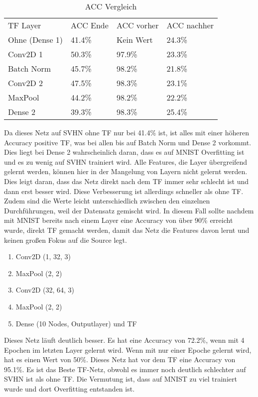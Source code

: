    \begin{table}[h!]
        \begin{center}
            \caption{ACC Vergleich}
            \label{tab1:Table}
            \begin{tabular}{l|l|l|l}
                TF Layer & ACC Ende & ACC vorher & ACC nachher \\
                Ohne (Dense 1) & 41.4\% & Kein Wert & 24.3\% \\
                Conv2D 1 & 50.3\% & 97.9\% & 23.3\% \\
                Batch Norm & 45.7\% & 98.2\% & 21.8\% \\
                Conv2D 2 & 47.5\% & 98.3\% & 23.1\% \\
                MaxPool & 44.2\% & 98.2\% & 22.2\% \\
                Dense 2 & 39.3\% & 98.3\% & 25.4\% \\
            \end{tabular}
        \end{center}
    \end{table}
    Da dieses Netz auf SVHN ohne TF nur bei 41.4\% ist, ist alles mit einer höheren Accuracy 
    positive TF, was bei allen bis auf Batch Norm und Dense 2 vorkommt. Dies liegt bei Dense 2 
    wahrscheinlich daran, dass es auf MNIST Overfitting ist und es zu wenig auf SVHN trainiert wird. 
    Alle Features, die Layer übergreifend gelernt werden, können hier in der Mangelung von Layern 
    nicht gelernt werden. Dies leigt daran, dass das Netz direkt nach dem TF immer sehr schlecht ist 
    und dann erst besser wird. Diese Verbesserung ist allerdings schneller als ohne TF. Zudem 
    sind die Werte leicht unterschiedlich zwischen den einzelnen Durchführungen, weil der 
    Datensatz gemischt wird. 
    In diesem Fall sollte nachdem mit MNIST bereits nach einem Layer eine Accuracy von über 90\% 
    erreicht wurde, direkt TF gemacht werden, damit das Netz die Features davon lernt und keinen 
    großen Fokus auf die Source legt. 


    \begin{enumerate}
        \item Conv2D (1, 32, 3)
        \item MaxPool (2, 2)
        \item Conv2D (32, 64, 3)
        \item MaxPool (2, 2)
        \item Dense (10 Nodes, Outputlayer) und TF
    \end{enumerate}
    Dieses Netz läuft deutlich besser. Es hat eine Accuracy von 72.2\%, wenn mit 4 Epochen im 
    letzten Layer gelernt wird. Wenn mit nur einer Epoche gelernt wird, hat es einen Wert von 
    50\%. 
    Dieses Netz hat vor dem TF eine Accuracy von 95.1\%. Es ist das Beste TF-Netz, obwohl es 
    immer noch deutlich schlechter auf SVHN ist als ohne TF. Die Vermutung ist, dass auf MNIST 
    zu viel trainiert wurde und dort Overfitting entstanden ist. 

